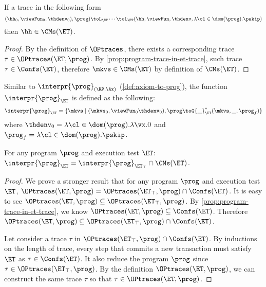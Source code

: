 \begin{corollary}
If a trace in the following form
\[
    (\hh_{0}, \viewFun_{0}, \thdenv_{0}), \prog) \toL_{\ET} \cdots \toL_{\ET} 
    (\hh, \viewFun, \thdenv, \lambda \cl \in \dom(\prog). \pskip)
\]
then $\hh \in \CMs(\ET)$.
\end{corollary}
\begin{proof}
    By the definition of \( \OPtraces \), 
    there exists a corresponding trace \( \tau \in \OPtraces(\ET, \prog) \).
    By \cref{prop:program-trace-in-et-trace}, such trace \( \tau \in \Confs(\ET) \),
    therefore \( \mkvs \in \CMs(\ET)\) by definition of \( \CMs(\ET) \).
\end{proof}

Similar to \( \interpr{\prog}_{(\RP,\Ax)} \) (\cref{def:axiom-to-prog}), the function \( \interpr{\prog}_{\ET} \) is defined as the following:
\[
    \interpr{\prog}_{\ET} = \{ \mkvs \mid (\mkvs_{0}, \viewFun_0 \thdenv_{0} ), \prog \toG{\_}_{\ET}^{\ast} (\mkvs, \_, \prog_{f}) \}
\]
where $\thdenv_{0} = \lambda \cl \in \dom(\prog).\lambda \vx.0$ and $\prog_{f} = \lambda \cl \in \dom(\prog).\pskip$.

\begin{proposition}
    \label{thm:consistency-intersect-permissive}
    For any program $\prog$ and execution test $\ET$:
    \( \interpr{\prog}_{\ET} = \interpr{\prog}_{\ET_\top}  \cap \CMs(\ET) \).
\end{proposition}
\begin{proof}
    We prove a stronger result that for any program $\prog$ and execution test $\ET$, $\OPtraces(\ET, \prog) = \OPtraces(\ET_{\top}, \prog) \cap \Confs(\ET)$.
    It is easy to see \(\OPtraces(\ET, \prog) \subseteq \OPtraces(\ET_\top, \prog) \).
    By \cref{prop:program-trace-in-et-trace}, we know \( \OPtraces(\ET, \prog) \subseteq \Confs(\ET)\).
    Therefore \(  \OPtraces(\ET, \prog) \subseteq \OPtraces(\ET_\top, \prog) \cap \Confs(\ET) \).

    Let consider a trace \( \tau \) in \( \OPtraces(\ET_\top, \prog) \cap \Confs(\ET) \).
    By inductions on the length of trace, 
    every step that commits a new transaction  must satisfy \( \ET \) as \( \tau \in \Confs(\ET) \).
    It also reduce the program \( \prog \) since \( \tau \in \OPtraces(\ET_\top, \prog) \).
    By the definition \( \OPtraces(\ET, \prog) \), we can construct the same trace \( \tau \) so that \( \tau \in \OPtraces(\ET, \prog) \).
\end{proof}
